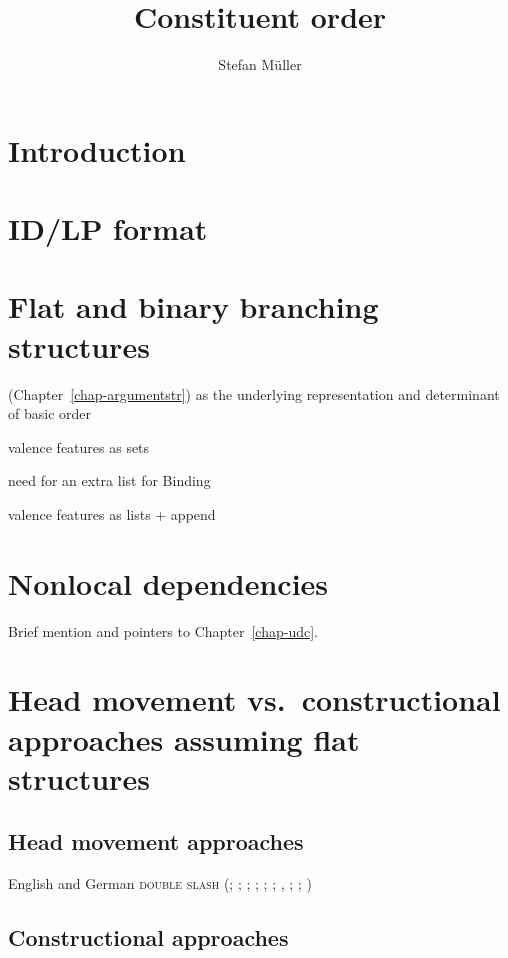\documentclass[output=paper]{langsci/langscibook}
\author{%
	Stefan Müller\affiliation{Humboldt-Universität zu Berlin}%
}
\title{Constituent order}
\begin{document}
\label{chap:constituents}

\section{Introduction} 



\section{ID/LP format}

\citet*{GKPS85a}

\section{Flat and binary branching structures}

\argst (Chapter~\ref{chap-argumentstr}) as the underlying representation and determinant of basic order

valence features as sets \citep*{Gunji86a,HN89a,Pollard90a,EEU92a}

need for an extra list for Binding 

\citet{AMM2013a}

valence features as lists + append \citep{MuellerHPSGHandbook}


\section{Nonlocal dependencies}

Brief mention and pointers to Chapter~\ref{chap-udc}.

\section{Head movement vs.\ constructional approaches assuming flat structures}

\subsection{Head movement approaches}

English \citep{Borsley89} and German \textsc{double slash} 
(\citealp*[Section~4.7]{KW91a}; \citealp{Oliva92a}; \citealp*{Netter92};   
\citealp*{Kiss93}; \citealp*{Frank94}; \citealp*{Kiss95a}; \citealp{Feldhaus97},
\citealp{Meurers2000b}; \citealp{Mueller2005c}; \citealp{MuellerGS})

\subsection{Constructional approaches}
\end{document}
